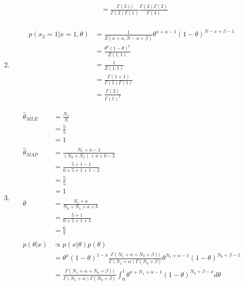 \documentclass[11pt,letterpaper]{article}
\begin{document}
\begin{enumerate}[labelindent=0pt]
\begin{align*}
	&= \frac{\Gamma(3))}{\Gamma(2)\Gamma(1)} \frac{\Gamma(3)\Gamma(2)}{\Gamma(4)} \\
	\end{align*}
\iffalse
Or
	\begin{align*}
	p(\theta|x) \propto Beta(\theta|N_{1}+a,N_{0}+b)
	\end{align*}
\fi
\item 
\iffalse
	\begin{align*}
	p(x_{2} =1| x = 1, \theta) &= Beta(\theta| x_{2} = 1, x = 1) \\
	&= \theta^{x_{2}-1}(1-\theta)^{x -1}
	\end{align*}
\fi
	\begin{align*}
	p(x_{2} =1| x = 1, \theta) &=\frac{1}{Z(x+\alpha, N-x+\beta)}
\theta^{x+\alpha-1}(1-\theta)^{N-x+\beta-1}\\
	& = \frac{\theta^0(1-\theta)^0}{Z(1,1)}\\
	& = \frac{1}{Z(1,1)}\\
	& = \frac{\Gamma(1+1)}{\Gamma(1)\Gamma(1)}\\
	& = \frac{\Gamma(2)}{\Gamma(1)^2}
	\end{align*}
\item 
	\begin{align*}
	\widehat{\theta}_{MLE} &= \frac{N_{1}}{N} \\
	&= \frac{5}{5}\\
	&=1\\
	\\
	\widehat{\theta}_{MAP} &= \frac{N_{1}+a-1}{(N_{0}+N_{1})+a+b-2}\\
	&= \frac{5+1-1}{0+5+1+1-2}\\
	&= \frac{5}{5}\\
	&= 1 \\
	\\
	\bar{\theta} &= \frac{N_{1}+a}{N_{0}+N_{1}+a+b}\\
	&= \frac{5+1}{0+5+1+1}\\
	&=\frac{6}{7}\\
	\\
	p(\theta|x) &\propto p(x|\theta)p(\theta) \\
	&= \theta^{x}(1-\theta)^{1-x} \frac{\Gamma(N_{1}+\alpha + N_{0}+\beta))}{\Gamma(N_{1}+\alpha)\Gamma(N_{0}+\beta)} \theta^{N_{1}+\alpha - 1}(1-\theta)^{N_{0}+\beta-1} \\
	&= \frac{\Gamma(N_{1}+\alpha + N_{0}+\beta))}{\Gamma(N_{1}+\alpha)\Gamma(N_{0}+\beta)} \int_{0}^{1}\theta^{x + N_{1}+\alpha - 1}(1-\theta)^{N_{0}+\beta-x}d\theta \\

\end{align*}
\end{enumerate}
\end{document}
